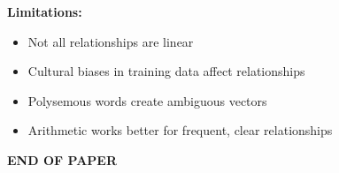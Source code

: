 \documentclass[12pt]{article}
\begin{document}
\begin{enumerate}[(a)]
{    \textbf{Limitations:}
    \begin{itemize}
        \item Not all relationships are linear
        \item Cultural biases in training data affect relationships
        \item Polysemous words create ambiguous vectors
        \item Arithmetic works better for frequent, clear relationships
    \end{itemize}
    }
\end{enumerate}

\vfill
\begin{center}{\bf END OF PAPER}\end{center}
\end{document}
